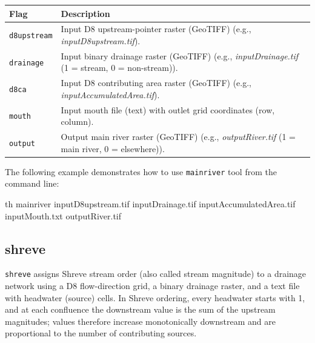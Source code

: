 \documentclass[
]{book}
\newenvironment{Shaded}{\begin{snugshade}}{\end{snugshade}}
\newcommand{\ExtensionTok}[1]{#1}
\newcommand{\NormalTok}[1]{#1}
\begin{document}
\begin{longtable}[]{@{}
  >{\raggedright\arraybackslash}p{}
  >{\raggedright\arraybackslash}p{}@{}}
\toprule\noalign{}
\begin{minipage}[b]{\linewidth}\raggedright
Flag
\end{minipage} & \begin{minipage}[b]{\linewidth}\raggedright
Description
\end{minipage} \\
\midrule\noalign{}
\endhead
\bottomrule\noalign{}
\endlastfoot
\texttt{d8upstream} & Input D8 upstream-pointer raster (GeoTIFF) (e.g., \emph{inputD8upstream.tif}). \\
\texttt{drainage} & Input binary drainage raster (GeoTIFF) (e.g., \emph{inputDrainage.tif} (1 = stream, 0 = non-stream)). \\
\texttt{d8ca} & Input D8 contributing area raster (GeoTIFF) (e.g., \emph{inputAccumulatedArea.tif}). \\
\texttt{mouth} & Input mouth file (text) with outlet grid coordinates (row, column). \\
\texttt{output} & Output main river raster (GeoTIFF) (e.g., \emph{outputRiver.tif} (1 = main river, 0 = elsewhere)). \\
\end{longtable}

The following example demonstrates how to use \texttt{mainriver} tool from the command line:

\begin{Shaded}
\begin{Highlighting}[]
\ExtensionTok{th}\NormalTok{ mainriver inputD8upstream.tif inputDrainage.tif inputAccumulatedArea.tif inputMouth.txt outputRiver.tif}
\end{Highlighting}
\end{Shaded}

\subsection{shreve}\label{shreve}

\texttt{shreve} assigns Shreve stream order (also called stream magnitude) to a drainage network using a D8 flow-direction grid, a binary drainage raster, and a text file with headwater (source) cells. In Shreve ordering, every headwater starts with 1, and at each confluence the downstream value is the sum of the upstream magnitudes; values therefore increase monotonically downstream and are proportional to the number of contributing sources.
\end{document}
